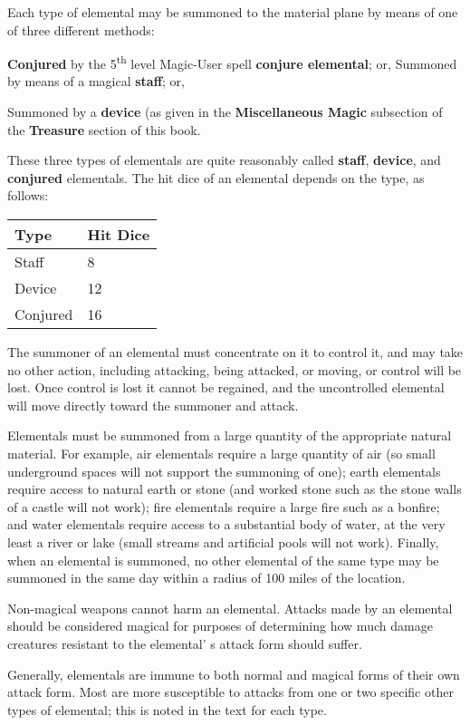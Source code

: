 \documentclass[a4paper,twoside,openany,10pt]{book}
\begin{document}
\begin{multicols}{2}
Each type of elemental may be summoned to the material plane by means of one of three different methods:

\textbf{Conjured} by the 5\textsuperscript{th} level Magic-User spell
\textbf{conjure elemental}; or, Summoned by means of a magical \textbf{staff}; or,

Summoned by a \textbf{device} (as given in the \textbf{Miscellaneous Magic} subsection of the \textbf{Treasure} section of this book.

These three types of elementals are quite reasonably called \textbf{staff}, \textbf{device}, and \textbf{conjured} elementals. The hit dice of an elemental depends on the type, as follows:\medskip

\begin{tabular*}{0.93\linewidth}{@{\extracolsep{\fill}}ll}
\textbf{Type} & \textbf{Hit Dice} \\\hline
Staff & 8 \\\hline
Device & 12 \\\hline
Conjured & 16 \\\hline
\end{tabular*}\medskip

The summoner of an elemental must concentrate on it to control it, and may take no other action, including attacking, being attacked, or moving, or control will be lost. Once control is lost it cannot be regained, and the uncontrolled elemental will move directly toward the summoner and attack.

Elementals must be summoned from a large quantity of the appropriate natural material. For example, air elementals require a large quantity of air (so small underground spaces will not support the summoning of one); earth elementals require access to natural earth or stone (and worked stone such as the stone walls of a castle will not work); fire elementals require a large fire such as a bonfire; and water elementals require access to a substantial body of water, at the very least a river or lake (small streams and artificial pools will not work). Finally, when an elemental is summoned, no other elemental of the same type may be summoned in the same day within a radius of 100 miles of the location.

Non-magical weapons cannot harm an elemental. Attacks made by an elemental should be considered magical for purposes of determining how much damage creatures resistant to the elemental' s attack form should suffer.

Generally, elementals are immune to both normal and magical forms of their own attack form. Most are more susceptible to attacks from one or two specific other types of elemental; this is noted in the text for each type.


\end{multicols}
\end{document}
